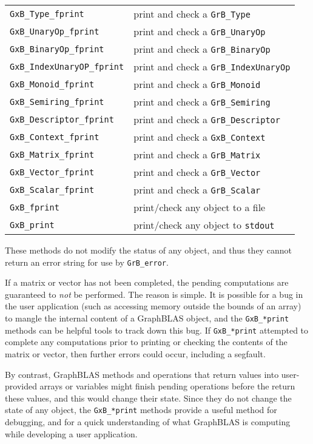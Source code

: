 \documentclass[12pt]{article}
\begin{document}
\vspace{0.2in}
{\footnotesize
\begin{tabular}{ll}
\hline
\verb'GxB_Type_fprint'         & print and check a \verb'GrB_Type' \\
\verb'GxB_UnaryOp_fprint'      & print and check a \verb'GrB_UnaryOp' \\
\verb'GxB_BinaryOp_fprint'     & print and check a \verb'GrB_BinaryOp' \\
\verb'GxB_IndexUnaryOP_fprint' & print and check a \verb'GrB_IndexUnaryOp' \\
\verb'GxB_Monoid_fprint'       & print and check a \verb'GrB_Monoid' \\
\verb'GxB_Semiring_fprint'     & print and check a \verb'GrB_Semiring' \\
\verb'GxB_Descriptor_fprint'   & print and check a \verb'GrB_Descriptor' \\
\verb'GxB_Context_fprint'      & print and check a \verb'GxB_Context' \\
\verb'GxB_Matrix_fprint'       & print and check a \verb'GrB_Matrix' \\
\verb'GxB_Vector_fprint'       & print and check a \verb'GrB_Vector' \\
\verb'GxB_Scalar_fprint'       & print and check a \verb'GrB_Scalar' \\
\hline
\verb'GxB_fprint'             & print/check any object to a file \\
\verb'GxB_print'              & print/check any object to \verb'stdout' \\
\hline
\end{tabular}
}
\vspace{0.2in}

These methods do not modify the status of any object, and thus they
cannot return an error string for use by \verb'GrB_error'.

If a matrix or vector
has not been completed, the pending computations are guaranteed to {\em not} be
performed. The reason is simple.  It is possible for a bug in the user
application (such as accessing memory outside the bounds of an array) to mangle
the internal content of a GraphBLAS object, and the \verb'GxB_*print' methods
can be helpful tools to track down this bug.  If \verb'GxB_*print' attempted to
complete any computations prior to printing or checking the contents of the
matrix or vector, then further errors could occur, including a segfault.

By contrast, GraphBLAS methods and operations that return values into
user-provided arrays or variables might finish pending operations before the
return these values, and this would change their state.  Since they do not
change the state of any object, the \verb'GxB_*print' methods provide a useful
method for debugging, and for a quick understanding of what GraphBLAS is
computing while developing a user application.
\end{document}
